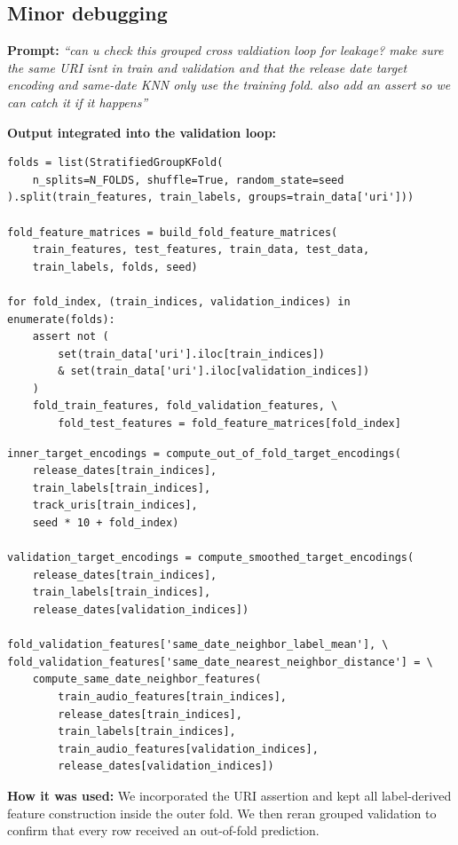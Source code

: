 \documentclass{article}
\begin{document}
\subsection{Minor debugging}
\noindent\textbf{Prompt:}
\emph{``can u check this grouped cross valdiation loop for leakage? make sure
the same URI isnt in train and validation and that the release date target
encoding and same-date KNN only use the training fold. also add an assert so
we can catch it if it happens''}

\noindent\textbf{Output integrated into the validation loop:}
\begin{lstlisting}[basicstyle=\ttfamily\scriptsize,breaklines=true]
folds = list(StratifiedGroupKFold(
    n_splits=N_FOLDS, shuffle=True, random_state=seed
).split(train_features, train_labels, groups=train_data['uri']))

fold_feature_matrices = build_fold_feature_matrices(
    train_features, test_features, train_data, test_data,
    train_labels, folds, seed)

for fold_index, (train_indices, validation_indices) in enumerate(folds):
    assert not (
        set(train_data['uri'].iloc[train_indices])
        & set(train_data['uri'].iloc[validation_indices])
    )
    fold_train_features, fold_validation_features, \
        fold_test_features = fold_feature_matrices[fold_index]
\end{lstlisting}

\begin{lstlisting}[basicstyle=\ttfamily\scriptsize,breaklines=true]
inner_target_encodings = compute_out_of_fold_target_encodings(
    release_dates[train_indices],
    train_labels[train_indices],
    track_uris[train_indices],
    seed * 10 + fold_index)

validation_target_encodings = compute_smoothed_target_encodings(
    release_dates[train_indices],
    train_labels[train_indices],
    release_dates[validation_indices])

fold_validation_features['same_date_neighbor_label_mean'], \
fold_validation_features['same_date_nearest_neighbor_distance'] = \
    compute_same_date_neighbor_features(
        train_audio_features[train_indices],
        release_dates[train_indices],
        train_labels[train_indices],
        train_audio_features[validation_indices],
        release_dates[validation_indices])
\end{lstlisting}

\noindent\textbf{How it was used:}
We incorporated the URI assertion and kept all label-derived feature
construction inside the outer fold. We then reran grouped validation to
confirm that every row received an out-of-fold prediction.
\end{document}
